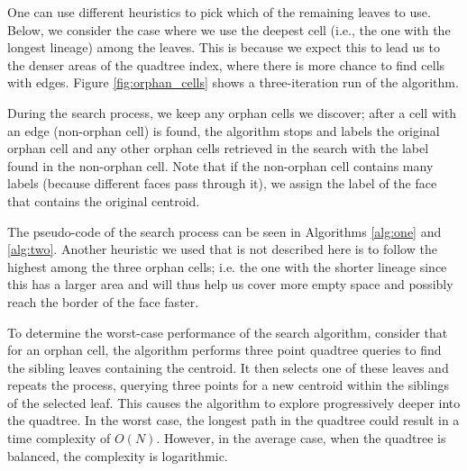 One can use different heuristics to pick which of the remaining leaves to use. Below, we consider the case where we use the deepest cell (i.e., the one with the 
longest lineage) among the leaves. This is because we expect this to lead us to the denser areas of the quadtree index, where there is more chance to find cells 
with edges. Figure \ref{fig:orphan_cells} shows a three-iteration run of the algorithm. 

During the search process, we keep any orphan cells we discover; after a cell with an edge (non-orphan cell) is found, the algorithm stops and labels the 
original orphan cell and any other orphan cells retrieved in the search with the label found in the non-orphan cell. Note that if the non-orphan cell contains 
many labels (because different faces pass through it), we assign the label of the face that contains the original centroid.

The pseudo-code of the search process can be seen in Algorithms \ref{alg:one} and \ref{alg:two}. Another heuristic we used that is not described here is to 
follow the highest among the three orphan cells; i.e. the one with the shorter lineage since this has a larger area and will thus help us cover more empty space 
and possibly reach the border of the face faster.

To determine the worst-case performance of the search algorithm, consider that for an orphan cell, the algorithm performs three point quadtree queries to find 
the sibling leaves containing the centroid. It then selects one of these leaves and repeats the process, querying three points for a new centroid within the 
siblings of the selected leaf. This causes the algorithm to explore progressively deeper into the quadtree. In the worst case, the longest path in the quadtree 
could result in a time complexity of $O(N)$. However, in the average case, when the quadtree is balanced, the complexity is logarithmic.

